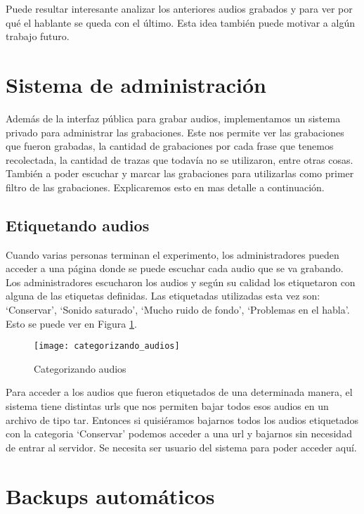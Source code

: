 Puede resultar interesante analizar los anteriores audios grabados y para ver por qué el hablante se queda con el último. Esta idea también puede motivar a algún trabajo futuro.

\section{Sistema de administración}

Además de la interfaz pública para grabar audios, implementamos un sistema privado para administrar las grabaciones. Este nos permite ver las grabaciones que fueron grabadas, la cantidad de grabaciones por cada frase que tenemos recolectada, la cantidad de trazas que todavía no se utilizaron, entre otras cosas. También a poder escuchar y marcar las grabaciones para utilizarlas como primer filtro de las grabaciones. Explicaremos esto en mas detalle a continuación.

\subsection{Etiquetando audios}

Cuando varias personas terminan el experimento, los administradores pueden acceder a una página donde se puede escuchar cada audio que se va grabando. Los administradores escucharon los audios y según su calidad los etiquetaron con alguna de las etiquetas definidas. Las etiquetadas utilizadas esta vez son: `Conservar’,  `Sonido saturado’, `Mucho ruido de fondo’, `Problemas en el habla’. Esto se puede ver en Figura \ref{cat}.

\begin{figure}[h!]
    \centerline{\texttt{[image: categorizando\_audios]} }
    \caption{Categorizando audios}
    \label{cat}
\end{figure}

Para acceder a los audios que fueron etiquetados de una determinada manera, el sistema tiene distintas urls que nos permiten bajar todos esos audios en un archivo de tipo tar. Entonces si quisiéramos bajarnos todos los audios etiquetados con la categoria `Conservar’ podemos acceder a una url y bajarnos sin necesidad de entrar al servidor. Se necesita ser usuario del sistema para poder acceder aquí.

\section{Backups automáticos}

